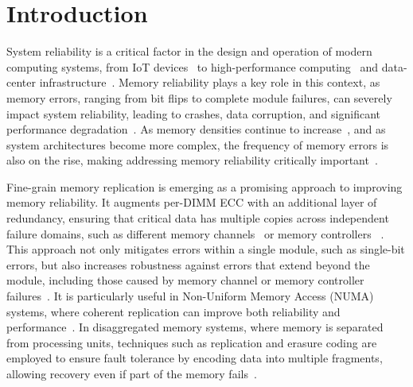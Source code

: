 \section{Introduction}
\label{sec:introduction}
System reliability is a critical factor in the design and operation of modern computing systems, from IoT devices~\cite{xing:iot-reliability:ieee-iotj:2020, philip:iot-healthcare:jsac:2021} to high-performance computing~\cite{schroeder:hpc-failures:tdsc:2010} and data-center infrastructure~\cite{beyer:sre-google:oreilly:2016}. 
Memory reliability plays a key role in this context, as memory errors, ranging from bit flips to complete module failures, can severely impact system reliability, leading to crashes, data corruption, and significant performance degradation~\cite{meza:dramfailures:dsn:2015}. 
As memory densities continue to increase~\cite{lee:ddr5:iedm:2023, zhang:pm-chipkill:micro:2018}, and as system architectures become more complex, the frequency of memory errors is also on the rise, making addressing memory reliability critically important~\cite{beigi:dram-faults:hpca:2023}.

Fine-grain memory replication is emerging as a promising approach to improving memory reliability. It augments per-DIMM ECC with an additional layer of redundancy, ensuring that critical data has multiple copies across independent
failure domains, such as different memory channels~\cite{zheng:raim:isca:2017} or memory controllers~ \cite{patil:dve:isca:2021}. 
This approach not only mitigates errors within a single module, such as single-bit errors, but also increases robustness against errors that extend beyond the module, including those caused by memory channel or memory controller failures~\cite{meza:dramfailures:dsn:2015}.
It is particularly useful in Non-Uniform Memory Access (NUMA) systems, where coherent replication can improve both reliability and performance~\cite{patil:dve:isca:2021}. 
In disaggregated memory systems, where memory is separated from processing units, techniques such as replication and erasure coding are employed to ensure fault tolerance by encoding data into multiple fragments, allowing recovery even if part of the memory fails~\cite{lee:hydra:fast:2022, zhou:carbink:osdi:2022, tsai:dpm:atc:2020, shan:legoos:osdi:2018}. 

